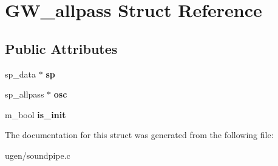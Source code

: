 \hypertarget{structGW__allpass}{}\section{G\+W\+\_\+allpass Struct Reference}
\label{structGW__allpass}
\subsection*{Public Attributes}
\begin{DoxyCompactItemize}
\item 
\hypertarget{structGW__allpass_a70ad96ba3e468a63e280ce85c0c62d4d}{}\label{structGW__allpass_a70ad96ba3e468a63e280ce85c0c62d4d} 
sp\+\_\+data $\ast$ {\bfseries sp}
\item 
\hypertarget{structGW__allpass_a37ff2c915c4ce26218fec81d6d16609a}{}\label{structGW__allpass_a37ff2c915c4ce26218fec81d6d16609a} 
sp\+\_\+allpass $\ast$ {\bfseries osc}
\item 
\hypertarget{structGW__allpass_a8ead4ea4e453a3e9166b53359b738903}{}\label{structGW__allpass_a8ead4ea4e453a3e9166b53359b738903} 
m\+\_\+bool {\bfseries is\+\_\+init}
\end{DoxyCompactItemize}


The documentation for this struct was generated from the following file\+:\begin{DoxyCompactItemize}
\item 
ugen/soundpipe.\+c\end{DoxyCompactItemize}
